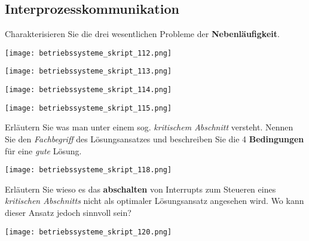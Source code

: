 \documentclass{article}
\begin{document}
\subsection{Interprozesskommunikation}
\begin{tcolorbox}[colback=white!10!white,colframe=lightgray!75!black,
  savelowerto=\jobname_ex.tex,breakable,enhanced,lines before break=40]

\justifying
Charakterisieren Sie die drei wesentlichen Probleme der \textbf{Nebenläufigkeit}.

\tcblower

\justifying
\begin{center}
\texttt{[image: betriebssysteme\_skript\_112.png]}
\end{center}
\begin{center}
\texttt{[image: betriebssysteme\_skript\_113.png]}
\end{center}
\begin{center}
\texttt{[image: betriebssysteme\_skript\_114.png]}
\end{center}
\begin{center}
\texttt{[image: betriebssysteme\_skript\_115.png]}
\end{center}

\end{tcolorbox}
\begin{tcolorbox}[colback=white!10!white,colframe=lightgray!75!black,
  savelowerto=\jobname_ex.tex,breakable,enhanced,lines before break=40]

\justifying
Erläutern Sie was man unter einem sog. \textit{kritischem Abschnitt} versteht. Nennen Sie den \textit{Fachbegriff} des Lösungsansatzes und beschreiben Sie die 4 \textbf{Bedingungen} für eine \textit{gute} Lösung.

\tcblower

\justifying
\begin{center}
\texttt{[image: betriebssysteme\_skript\_118.png]}
\end{center}

\end{tcolorbox}
\begin{tcolorbox}[colback=white!10!white,colframe=lightgray!75!black,
  savelowerto=\jobname_ex.tex,breakable,enhanced,lines before break=40]

\justifying
Erläutern Sie wieso es das \textbf{abschalten} von Interrupts zum Steueren eines \textit{kritischen Abschnitts} nicht als optimaler Lösungsansatz angesehen wird. Wo kann dieser Ansatz jedoch sinnvoll sein?

\tcblower

\justifying
\begin{center}
\texttt{[image: betriebssysteme\_skript\_120.png]}
\end{center}

\end{tcolorbox}
\end{document}
